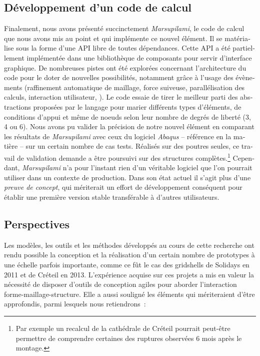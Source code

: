 \begin{otherlanguage}{french}
\subsection*{Développement d'un code de calcul}

Finalement, nous avons présenté succinctement \emph{Marsupilami}, le code de calcul que nous avons mis au point et qui implémente ce nouvel élément. Il se matérialise sous la forme d'une API \Csharp{} libre de toutes dépendances. Cette API a été partiellement implémentée dans une bibliothèque de composants \grasshopper{} pour servir d'interface graphique. De nombreuses pistes ont été explorées concernant l'architecture du code pour le doter de nouvelles possibilités, notamment grâce à l'usage des évènements (raffinement automatique de maillage, force suiveuse, parallélisation des calculs, interaction utilisateur, \telp{}). Le code essaie de tirer le meilleur parti des abstractions proposées par le langage \Csharp{} pour marier différents types d'éléments, de conditions d'appui et même de noeuds selon leur nombre de degrés de liberté (3, 4 ou 6). Nous avons pu valider la précision de notre nouvel élément en comparant les résultats de \emph{Marsupilami} avec ceux du logiciel \emph{Abaqus} -- référence en la matière -- sur un certain nombre de cas tests. Réalisés sur des poutres seules, ce travail de validation demande a être poursuivi sur des structures complètes.\footnote{Par exemple un recalcul de la cathédrale de Créteil pourrait peut-être permettre de comprendre certaines des ruptures observées 6 mois après le montage.} Cependant, \emph{Marsupilami} n'a pour l'instant rien d'un véritable logiciel que l'on pourrait utiliser dans un contexte de production. Dans son état actuel il s'agit plus d'une \emph{preuve de concept}, qui mériterait un effort de développement conséquent pour établir une première version stable transférable à d'autres utilisateurs.

\subsection*{Perspectives}
Les modèles, les outils et les méthodes développés au cours de cette recherche ont rendu possible la conception et la réalisation d'un certain nombre de prototypes à une échelle parfois importante, comme ce fût le cas des gridshells de Solidays en 2011 et de Créteil en 2013. L'expérience acquise sur ces projets a mis en valeur la nécessité de disposer d'outils de conception agiles pour aborder l'interaction forme-maillage-structure. Elle a aussi souligné les éléments qui mériteraient d'être approfondis, parmi lesquels nous retiendrons~: 


\end{otherlanguage}
